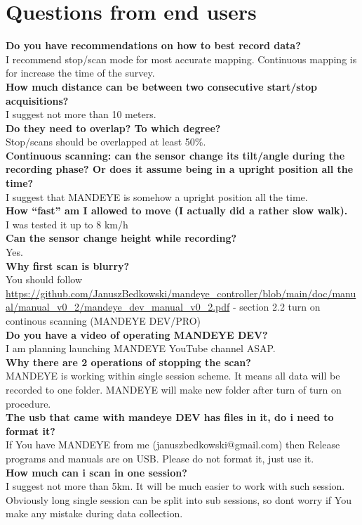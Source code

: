 \chapter{Questions from end users}

\textbf{Do you have recommendations on how to best record data?} \\
I recommend stop/scan mode for most accurate mapping.
Continuous mapping is for increase the time of the survey.  \\
\textbf{How much distance can be between two consecutive start/stop acquisitions?}\\
I suggest not more than 10 meters.\\
\textbf{Do they need to overlap? To which degree?}\\
Stop/scans should be overlapped at least 50\%.\\
\textbf{Continuous scanning: can the sensor change its tilt/angle during the recording phase? 
Or does it assume being in a upright position all the time?} \\
I suggest that MANDEYE  is somehow a upright position all the time. \\
\textbf{How “fast” am I allowed to move (I actually did a rather slow walk).} \\
I was tested it up to 8 km/h\\
\textbf{Can the sensor change height while recording?}\\
Yes.\\
\textbf{Why first scan is blurry?}\\
You should follow \url{https://github.com/JanuszBedkowski/mandeye_controller/blob/main/doc/manual/manual_v0_2/mandeye_dev_manual_v0_2.pdf} - section 2.2 turn on continous scanning (MANDEYE DEV/PRO)\\
\textbf{Do you have a video of operating MANDEYE DEV?}\\
I am planning launching MANDEYE YouTube channel ASAP.\\
\textbf{Why there are 2 operations of stopping the scan?}\\
MANDEYE is working within single session scheme. It means all data will be recorded to one folder. MANDEYE will make new folder after turn of turn on procedure.\\
\textbf{The usb that came with mandeye DEV has files in it, do i need to format it?}\\
If You have MANDEYE from me (januszbedkowski@gmail.com) then Release programs and manuals are on USB. Please do not format it, just use it.\\
\textbf{How much can i scan in one session?}\\
I suggest not more than 5km. It will be much easier to work with such session. Obviously long single session can be split into sub sessions, so dont worry if You make any mistake during data collection.\\




 
